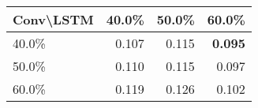 \begin{tabular}{lrrr}
\toprule
Conv\textbackslash LSTM & 40.0\% & 50.0\% & 60.0\% \\
\midrule
40.0\% & 0.107 & 0.115 & \bfseries 0.095 \\
50.0\% & 0.110 & 0.115 & 0.097 \\
60.0\% & 0.119 & 0.126 & 0.102 \\
\bottomrule
\end{tabular}
